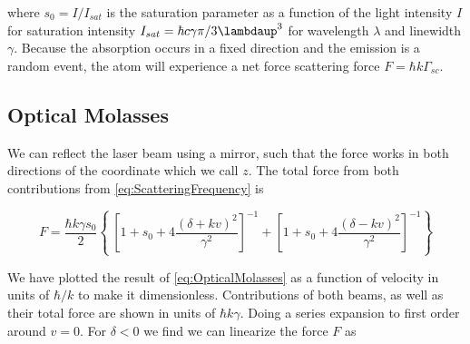 where $s_0 = I/I_{sat}$ is the saturation parameter as a function of the light intensity $I$ for saturation intensity $I_{sat} = \hbar c \gamma \pi/3\lambdaup^3$ for wavelength $\lambda$ and linewidth $\gamma$. Because the absorption occurs in a fixed direction and the emission is a random event, the atom will experience a net force scattering force $F = \hbar k \Gamma_{sc}$.

\subsection{Optical Molasses}

We can reflect the laser beam using a mirror, such that the force works in both directions of the coordinate which we call $z$. The total force from both contributions from \cref{eq:ScatteringFrequency} is \cite{Kowalski2010}

\begin{equation}\label{eq:OpticalMolasses}
	F = \frac{\hbar k \gamma s_0}{2}\left\{\
	\left[1 + s_0 + 4\frac{(\delta+kv)^2}{\gamma^2}\right]^{-1}+
	\left[1 + s_0 + 4\frac{(\delta-kv)^2}{\gamma^2}\right]^{-1}
	\right\}
\end{equation}

We have plotted the result of \cref{eq:OpticalMolasses} as a function of velocity in units of $\hbar / k$ to make it dimensionless. Contributions of both beams, as well as their total force are shown in units of $\hbar k \gamma$. Doing a series expansion to first order around $v = 0$. For $\delta<0$ we find we can linearize the force $F$ as 

